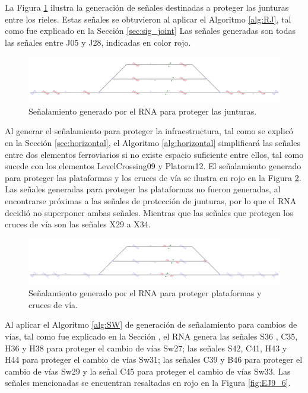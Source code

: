 	La Figura \ref{fig:EJ9_4} ilustra la generación de señales destinadas a proteger las junturas entre los rieles. Estas señales se obtuvieron al aplicar el Algoritmo \ref{alg:RJ}, tal como fue explicado en la Sección \ref{sec:sig_joint} Las señales generadas son todas las señales entre J05 y J28, indicadas en color rojo.

	\begin{figure}[H]
		\centering
		\includegraphics[width=1\textwidth]{resultados-obtenidos/ejemplo9/images/9_step2.png}
		\centering\caption{Señalamiento generado por el RNA para proteger las junturas.}
		\label{fig:EJ9_4}
	\end{figure}

	Al generar el señalamiento para proteger la infraestructura, tal como se explicó en la Sección \ref{sec:horizontal}, el Algoritmo \ref{alg:horizontal} simplificará las señales entre dos elementos ferroviarios si no existe espacio suficiente entre ellos, tal como sucede con los elementos LevelCrossing09 y Platorm12. El señalamiento generado para proteger las plataformas y los cruces de vía se ilustra en rojo en la Figura \ref{fig:EJ9_5}. Las señales generadas para proteger las plataformas no fueron generadas, al encontrarse próximas a las señales de protección de junturas, por lo que el RNA decidió no superponer ambas señales. Mientras que las señales que protegen los cruces de vía son las señales X29 a X34.

	\begin{figure}[H]
		\centering
		\includegraphics[width=1\textwidth]{resultados-obtenidos/ejemplo9/images/9_step3.png}
		\centering\caption{Señalamiento generado por el RNA para proteger plataformas y cruces de vía.}
		\label{fig:EJ9_5}
	\end{figure}

	Al aplicar el Algoritmo \ref{alg:SW} de generación de señalamiento para cambios de vías, tal como fue explicado en la Sección \label{sec:signal_switches}, el RNA genera  las señales S36 , C35, H36 y H38 para proteger el cambio de vías Sw27; las señales S42, C41, H43 y H44 para proteger el cambio de vías Sw31; las señales C39 y B46 para proteger el cambio de vías Sw29 y la señal C45 para proteger el cambio de vías Sw33. Las señales mencionadas se encuentran resaltadas en rojo en la Figura \ref{fig:EJ9_6}.

